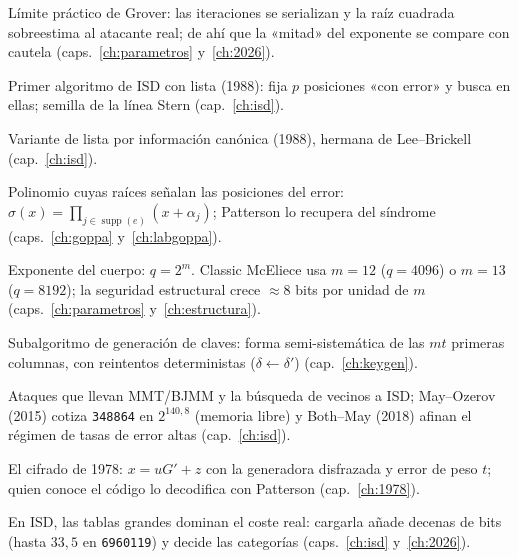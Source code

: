 \documentclass[11pt,a4paper,oneside]{report}
\newcommand{\supp}{\operatorname{supp}}
\begin{document}
\begin{description}[leftmargin=2.6em,style=nextline,itemsep=2.5pt,parsep=0pt]
  \item[\textbf{Latencia (cuántica)}]
        Límite práctico de Grover: las iteraciones se serializan y
        la raíz cuadrada sobreestima al atacante real; de ahí que
        la «mitad» del exponente se compare con cautela
        (caps.~\ref{ch:parametros} y~\ref{ch:2026}).

  \item[\textbf{Lee--Brickell}]
        Primer algoritmo de ISD con lista (1988): fija $p$
        posiciones «con error» y busca en ellas; semilla de la
        línea Stern (cap.~\ref{ch:isd}).

  \item[\textbf{Leon}]
        Variante de lista por información canónica (1988),
        hermana de Lee--Brickell (cap.~\ref{ch:isd}).

  \item[\textbf{Localizador (polinomio $\sigma$)}]
        Polinomio cuyas raíces señalan las posiciones del error:
        $\sigma(x)=\prod_{j\in\supp(e)}(x+\alpha_j)$; Patterson lo
        recupera del síndrome (caps.~\ref{ch:goppa}
        y~\ref{ch:labgoppa}).

  \item[\textbf{$m$}]
        Exponente del cuerpo: $q=2^m$. Classic McEliece usa
        $m=12$ ($q=4096$) o $m=13$ ($q=8192$); la seguridad
        estructural crece $\approx8$ bits por unidad de $m$
        (caps.~\ref{ch:parametros} y~\ref{ch:estructura}).

  \item[\textbf{MatGen}]
        Subalgoritmo de generación de claves: forma
        semi-sistemática de las $mt$ primeras columnas, con
        reintentos deterministas ($\delta\leftarrow\delta'$)
        (cap.~\ref{ch:keygen}).

  \item[\textbf{May--Ozerov / Both--May}]
        Ataques que llevan MMT/BJMM y la búsqueda de vecinos a
        ISD; May--Ozerov (2015) cotiza \texttt{348864} en
        $2^{140{,}8}$ (memoria libre) y Both--May (2018) afinan el
        régimen de tasas de error altas (cap.~\ref{ch:isd}).

  \item[\textbf{McEliece (criptosistema)}]
        El cifrado de 1978: $x=uG'+z$ con la generadora disfrazada
        y error de peso $t$; quien conoce el código lo decodifica
        con Patterson (cap.~\ref{ch:1978}).

  \item[\textbf{Memoria (coste de la)}]
        En ISD, las tablas grandes dominan el coste real: cargarla
        añade decenas de bits (hasta $33{,}5$ en \texttt{6960119})
        y decide las categorías (caps.~\ref{ch:isd}
        y~\ref{ch:2026}).


\end{description}
\end{document}

